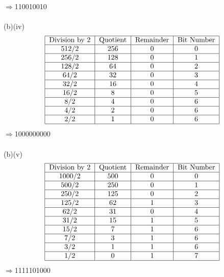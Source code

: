 \documentclass{article}
\begin{document}
$\Rightarrow$110010010
\\\\(b)(iv)\[\begin{tabular}{|c|c|c|c|}
\hline
\text{Division by 2}&\text{Quotient}&\text{Remainder}&\text{Bit Number}\\
\hline
$512/2$&256&0&0\\
\hline
$256/2$&128&0&1\\
\hline
$128/2$&64&0&2\\
\hline
$64/2$&32&0&3\\
\hline
$32/2$&16&0&4\\
\hline
$16/2$&8&0&5\\
\hline
$8/2$&4&0&6\\
\hline
$4/2$&2&0&6\\
\hline
$2/2$&1&0&6\\
\hline
\end{tabular}\]
$\Rightarrow$1000000000
\\\\(b)(v)\[\begin{tabular}{|c|c|c|c|}
\hline
\text{Division by 2}&\text{Quotient}&\text{Remainder}&\text{Bit Number}\\
\hline
$1000/2$&500&0&0\\
\hline
$500/2$&250&0&1\\
\hline
$250/2$&125&0&2\\
\hline
$125/2$&62&1&3\\
\hline
$62/2$&31&0&4\\
\hline
$31/2$&15&1&5\\
\hline
$15/2$&7&1&6\\
\hline
$7/2$&3&1&6\\
\hline
$3/2$&1&1&6\\
\hline
$1/2$&0&1&7\\
\hline
\end{tabular}\]
$\Rightarrow$1111101000
\end{document}
